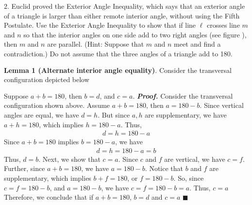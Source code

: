 \documentclass{report}
\begin{document}
    \pagebreak \bigbreak \noindent 
    \begin{mdframed}
        2. Euclid proved the Exterior Angle Inequality, which says that an exterior angle of a triangle is larger than either remote interior angle, without using the Fifth Postulate. Use the Exterior Angle Inequality to show that if line $\ell$ crosses line $m$ and $n$ so that the interior angles on one side add to two right angles (see figure \thefigtitle), then $m$ and $n$ are parallel. (Hint: Suppose that $m$ and $n$ meet and find a contradiction.) Do not assume that the three angles of a triangle add to 180.
    \end{mdframed}
    \bigbreak \noindent 
    \begin{figure}[ht]
        \centering
        \label{fig:fig4}
    \end{figure}
    \fc{}
    \bigbreak \noindent 
    \textbf{Lemma 1 (Alternate interior angle equality)}. Consider the transversal configuration depicted below
    \bigbreak \noindent 
    \begin{figure}[ht]
        \centering
        \label{fig:tc}
    \end{figure}
    \bigbreak \noindent 
    Suppose $a + b = 180$, then $b = d$, and $c=a$.
    \bigbreak \noindent 
    \textbf{\textit{Proof.}} Consider the transversal configuration shown above. Assume $a+b = 180$, then $a=180-b$. Since vertical angles are equal, we have $d=h$. But since $a,h$ are supplementary, we have $a + h = 180$, which implies $h = 180 -a$. Thus,
    \begin{align*}
        d = h = 180 - a
    \end{align*}
    Since $a+b = 180$ implies $ b = 180-a$, we have
    \begin{align*}
        d = h = 180 - a = b
    \end{align*}
    \bigbreak \noindent 
    Thus, $d=b$. Next, we show that $c=a$. Since $c$ and $f$ are vertical, we have $c = f$. Further, since $a + b =180$, we have $a = 180 -b$. Notice that $b$ and $f$ are supplementary, which implies $b + f = 180$, or $f = 180 - b $. So, since $c=f = 180 -b$, and $a = 180-b$, we have $c = f = 180 - b = a$. Thus, $c=a$
    \bigbreak \noindent 
    Therefore, we conclude that if $a+ b =180$, $b = d$ and $c = a $ \hspace*{\fill}$\blacksquare$
\end{document}
